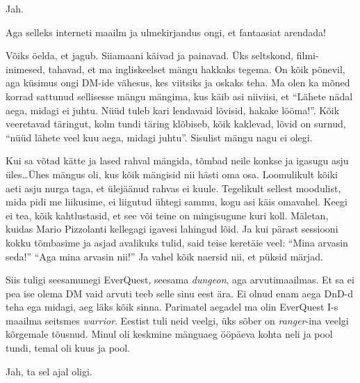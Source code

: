 
Jah.
                 

Aga selleks interneti maailm ja ulmekirjandus ongi, et fantaasiat arendada!


Võiks öelda, et jagub. Siiamaani käivad ja painavad. Üks seltskond, filmi-inimesed, tahavad, et ma ingliskeelset mängu hakkaks tegema. On kõik põnevil, aga küsimus ongi DM-ide vähesus, kes viitsiks ja oskaks teha. Ma olen ka mõned korrad sattunud sellisesse mängu mängima, kus käib asi niiviisi, et \enquote{Lähete nädal aega, midagi ei juhtu. Nüüd tuleb kari lendavaid lõvisid, hakake lööma!}. Kõik veeretavad täringut, kolm tundi täring klõbiseb, kõik kaklevad, lõvid on surnud, \enquote{nüüd lähete veel kuu aega, midagi juhtu}.  Sisulist mängu nagu ei olegi. 

Kui sa võtad kätte ja lased rahval mängida, tõmbad neile konkse ja igasugu asju üles\ldots Ühes mängus oli, kus kõik mängisid nii hästi oma osa. Loomulikult kõiki aeti asju nurga taga, et ülejäänud rahvas ei kuule. Tegelikult sellest moodulist, mida pidi me  liikusime, ei liigutud ühtegi sammu, kogu asi käis omavahel. Keegi ei tea, kõik kahtlustasid, et see või teine on mingisugune kuri koll. Mäletan, kuidas Mario Pizzolanti  kellegagi  igavesi lahingud lõid. Ja kui pärast sessiooni kokku tõmbasime ja asjad avalikuks tulid, said teise keretäie veel: \enquote{Mina arvasin seda!} \enquote{Aga mina arvasin nii!} Ja vahel kõik naersid nii, et püksid märjad. 

Siis tuligi seesamunegi EverQuest, seesama \emph{dungeon}, aga arvutimaailmas. Et sa ei pea ise olema DM vaid arvuti teeb selle sinu eest ära. Ei olnud enam aega DnD-d teha ega midagi, aeg läks kõik sinna. Parimatel aegadel ma olin  EverQuest I-s maailma seitsmes \emph{warrior}. Eestist tuli neid veelgi, üks sõber on \emph{ranger}-ina veelgi kõrgemale tõusnud. Minul oli keskmine mänguaeg ööpäeva kohta neli ja pool tundi, temal oli kuus ja pool. 


Jah, ta sel ajal oligi.
                 


